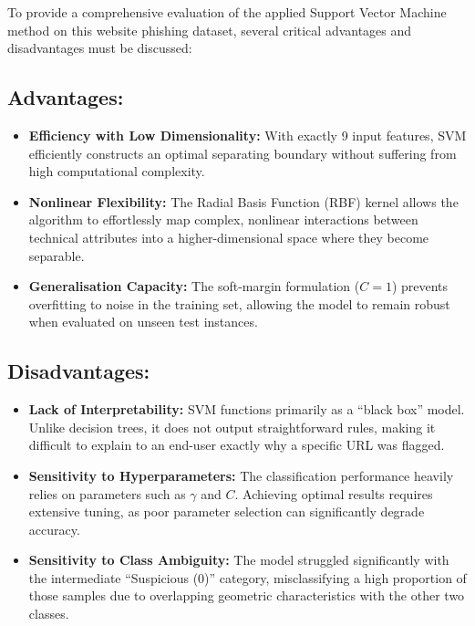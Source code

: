 \documentclass[11pt,a4paper]{article}
\begin{document}
To provide a comprehensive evaluation of the applied Support Vector Machine method on this website phishing dataset, several critical advantages and disadvantages must be discussed:

\subsection*{Advantages:}
\begin{itemize}[itemsep=1pt, topsep=2pt]
    \item \textbf{Efficiency with Low Dimensionality:} With exactly 9 input features, SVM efficiently constructs an optimal separating boundary without suffering from high computational complexity.
    \item \textbf{Nonlinear Flexibility:} The Radial Basis Function (RBF) kernel allows the algorithm to effortlessly map complex, nonlinear interactions between technical attributes into a higher-dimensional space where they become separable.
    \item \textbf{Generalisation Capacity:} The soft-margin formulation ($C=1$) prevents overfitting to noise in the training set, allowing the model to remain robust when evaluated on unseen test instances.
\end{itemize}

\subsection*{Disadvantages:}
\begin{itemize}[itemsep=1pt, topsep=2pt]
    \item \textbf{Lack of Interpretability:} SVM functions primarily as a ``black box'' model. Unlike decision trees, it does not output straightforward rules, making it difficult to explain to an end-user exactly why a specific URL was flagged.
    \item \textbf{Sensitivity to Hyperparameters:} The classification performance heavily relies on parameters such as $\gamma$ and $C$. Achieving optimal results requires extensive tuning, as poor parameter selection can significantly degrade accuracy.
    \item \textbf{Sensitivity to Class Ambiguity:} The model struggled significantly with the intermediate ``Suspicious (0)'' category, misclassifying a high proportion of those samples due to overlapping geometric characteristics with the other two classes.
\end{itemize}
\end{document}
